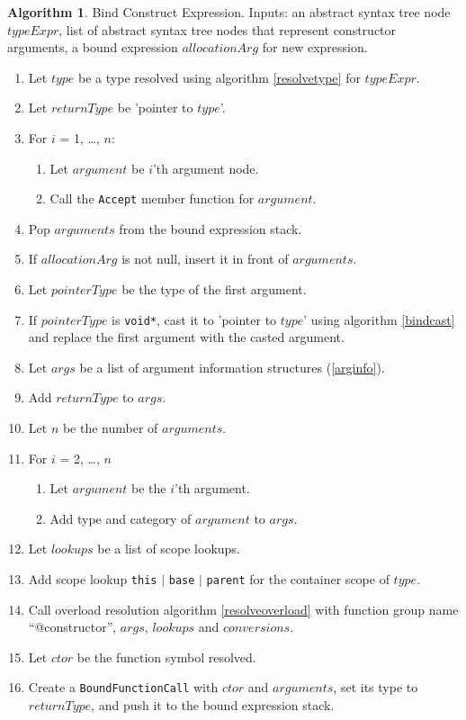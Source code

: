 \documentclass[a4paper,oneside,11pt]{book}
\theoremstyle{definition}
\newtheorem{algo}{Algorithm}[section]
\begin{document}
\begin{algo}\label{bindconstruct} Bind Construct Expression.
Inputs: an abstract syntax tree node $typeExpr$, list of abstract syntax tree nodes that represent constructor arguments,
a bound expression $allocationArg$ for new expression.
\begin{enumerate}
\item
Let $type$ be a type resolved using algorithm \ref{resolvetype} for $typeExpr$.
\item
Let $returnType$ be 'pointer to $type$'.
\item
For $i$ = 1, \ldots, $n$:
\begin{enumerate}
\item
Let $argument$ be $i$'th argument node.
\item
Call the \verb|Accept| member function for $argument$.
\end{enumerate}
\item
Pop $arguments$ from the bound expression stack.
\item
If $allocationArg$ is not null, insert it in front of $arguments$.
\item
Let $pointerType$ be the type of the first argument.
\item
If $pointerType$ is \verb|void*|, cast it to 'pointer to $type$' using algorithm \ref{bindcast} and replace the first argument with the casted argument.
\item
Let $args$ be a list of argument information structures (\ref{arginfo}).
\item
Add $returnType$ to $args$.
\item
Let $n$ be the number of $arguments$.
\item
For $i$ = 2, \ldots, $n$
\begin{enumerate}
\item
Let $argument$ be the $i$'th argument.
\item
Add type and category of $argument$ to $args$.
\end{enumerate}
\item
Let $lookups$ be a list of scope lookups.
\item
Add scope lookup \verb|this| $|$ \verb|base| $|$ \verb|parent| for the container scope of $type$.
\item
Call overload resolution algorithm \ref{resolveoverload} with function group name ``@constructor'', $args$, $lookups$ and $conversions$.
\item
Let $ctor$ be the function symbol resolved.
\item
Create a \verb|BoundFunctionCall| with $ctor$ and $arguments$, set its type to $returnType$, and push it to the bound expression stack.
\end{enumerate}
\end{algo}
\end{document}
